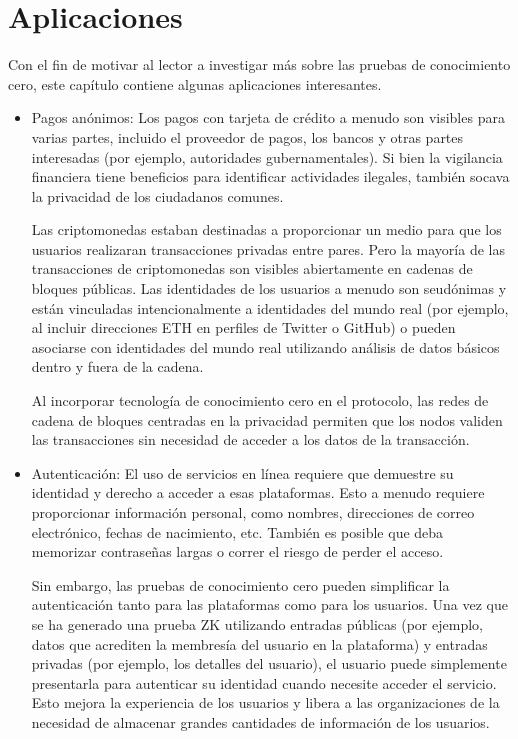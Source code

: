 \section{Aplicaciones}

Con el fin de motivar al lector a investigar más sobre las pruebas de conocimiento cero, este capítulo contiene algunas aplicaciones interesantes.

\begin{itemize}
    \item Pagos anónimos: Los pagos con tarjeta de crédito a menudo son visibles para varias partes, incluido el proveedor de pagos, los bancos y otras partes interesadas (por ejemplo, autoridades gubernamentales). Si bien la vigilancia financiera tiene beneficios para identificar actividades ilegales, también socava la privacidad de los ciudadanos comunes.
    
    Las criptomonedas estaban destinadas a proporcionar un medio para que los usuarios realizaran transacciones privadas entre pares. Pero la mayoría de las transacciones de criptomonedas son visibles abiertamente en cadenas de bloques públicas. Las identidades de los usuarios a menudo son seudónimas y están vinculadas intencionalmente a identidades del mundo real (por ejemplo, al incluir direcciones ETH en perfiles de Twitter o GitHub) o pueden asociarse con identidades del mundo real utilizando análisis de datos básicos dentro y fuera de la cadena.

    Al incorporar tecnología de conocimiento cero en el protocolo, las redes de cadena de bloques centradas en la privacidad permiten que los nodos validen las transacciones sin necesidad de acceder a los datos de la transacción.
    
    \item Autenticación: El uso de servicios en línea requiere que demuestre su identidad y derecho a acceder a esas plataformas. Esto a menudo requiere proporcionar información personal, como nombres, direcciones de correo electrónico, fechas de nacimiento, etc. También es posible que deba memorizar contraseñas largas o correr el riesgo de perder el acceso.
    
    Sin embargo, las pruebas de conocimiento cero pueden simplificar la autenticación tanto para las plataformas como para los usuarios. Una vez que se ha generado una prueba ZK utilizando entradas públicas (por ejemplo, datos que acrediten la membresía del usuario en la plataforma) y entradas privadas (por ejemplo, los detalles del usuario), el usuario puede simplemente presentarla para autenticar su identidad cuando necesite acceder el servicio. Esto mejora la experiencia de los usuarios y libera a las organizaciones de la necesidad de almacenar grandes cantidades de información de los usuarios.


\end{itemize}
